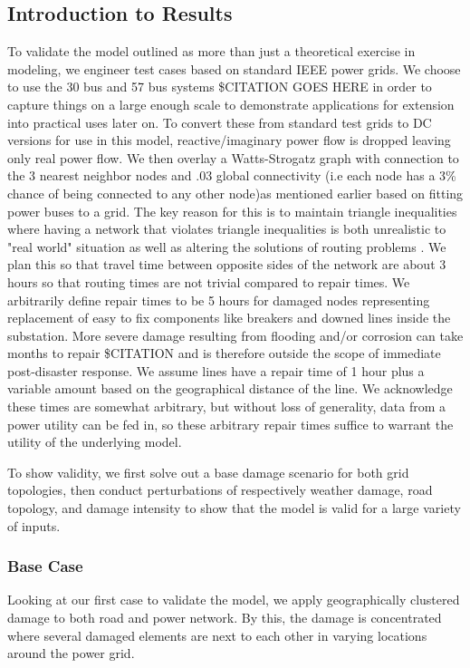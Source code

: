 \documentclass{article}
\begin{document}
	\subsection{Introduction to Results}
	To validate the model outlined as more than just a theoretical exercise in modeling, we engineer test cases based on standard IEEE power grids. We choose to use the 30 bus and 57 bus systems \$CITATION GOES HERE in order to capture things on a large enough scale to demonstrate applications for extension into practical uses later on. To convert these from standard test grids to DC versions for use in this model, reactive/imaginary power flow is dropped leaving only real power flow. We then overlay a Watts-Strogatz graph with connection to the 3 nearest neighbor nodes and .03 global connectivity (i.e each node has a 3\% chance of being connected to any other node)as mentioned earlier based on fitting power buses to a grid. The key reason for this is to maintain triangle inequalities where having a network that violates triangle inequalities is both unrealistic to "real world" situation as well as altering the solutions of routing problems \cite{FlemingEA2013}. We plan this so that travel time between opposite sides of the network are about 3 hours so that routing times are not trivial compared to repair times. We arbitrarily define repair times to be 5 hours for damaged nodes representing replacement of easy to fix components like breakers and downed lines inside the substation. More severe damage resulting from flooding and/or corrosion can take months to repair \$CITATION and is therefore outside the scope of immediate post-disaster response. We assume lines have a repair time of 1 hour plus a variable amount based on the geographical distance of the line. We acknowledge these times are somewhat arbitrary, but without loss of generality, data from a power utility can be fed in, so these arbitrary repair times suffice to warrant the utility of the underlying model.
	
	To show validity, we first solve out a base damage scenario for both grid topologies, then conduct perturbations of respectively weather damage, road topology, and damage intensity to show that the model is valid for a large variety of inputs. 
	
	\subsubsection{Base Case}
	Looking at our first case to validate the model, we apply geographically clustered damage to both road and power network. By this, the damage is concentrated where several damaged elements are next to each other in varying locations around the power grid. 
	
\end{document}
